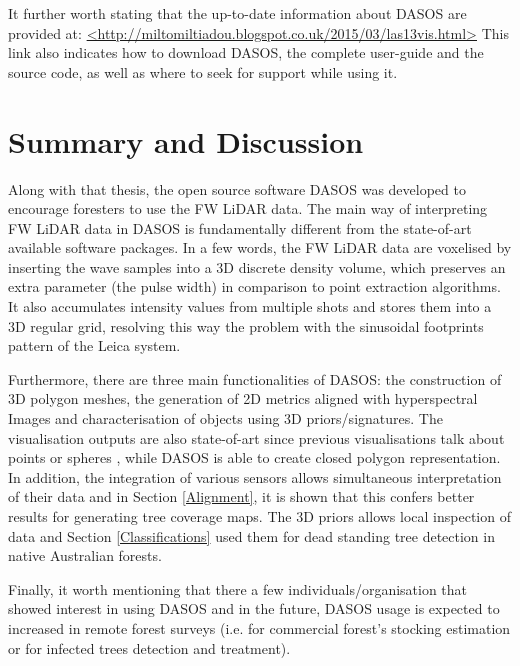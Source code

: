 \documentclass{subfiles}
\begin{document}
	   	
	   	\par It further worth stating that the up-to-date information about DASOS are provided at: \url{<http://miltomiltiadou.blogspot.co.uk/2015/03/las13vis.html>} 
	   	This link also indicates how to download DASOS, the complete user-guide and the source code, as well as where to seek for support while using it. 
	   	 
       
	   	
	   
	   	
	  \section{Summary and Discussion} \label{DASOS-Vol-Summary}
	  
	   	Along with that thesis, the open source software DASOS was developed to encourage foresters to use the FW LiDAR data. The main way of interpreting FW LiDAR data in DASOS is fundamentally different from the state-of-art available software packages. In a few words, the FW LiDAR data are voxelised by inserting the wave samples into a 3D discrete density volume, which preserves an extra parameter (the pulse width) in comparison to point extraction algorithms. It also accumulates intensity values from multiple shots and stores them into a 3D regular grid, resolving this way the problem with the sinusoidal footprints pattern of the Leica system.
	   	
	   	Furthermore, there are three main functionalities of DASOS: the construction of 3D polygon meshes, the generation of 2D metrics aligned with hyperspectral Images and characterisation of objects using 3D priors/signatures. The visualisation outputs are also state-of-art since previous visualisations talk about points \cite{Bunting2013} or spheres \cite{Chauve2009}, while DASOS is able to create closed polygon representation. In addition, the integration of various sensors allows simultaneous interpretation of their data and in Section \ref{Alignment}, it is shown that this confers better results for generating tree coverage maps. The 3D priors allows local inspection of data and Section \ref{Classifications} used them for dead standing tree detection in native Australian forests.
	   		
	   	Finally, it worth mentioning that there a few individuals/organisation that showed interest in using DASOS and in the future, DASOS usage is expected to increased in remote forest surveys (i.e. for commercial forest’s stocking estimation or for infected trees detection and treatment).
	   	
	   	
\end{document}
